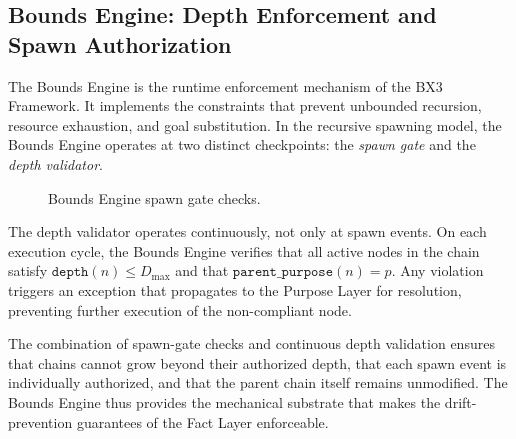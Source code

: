 \subsection{Bounds Engine: Depth Enforcement and Spawn Authorization}
\label{sec:bounds-engine}

The Bounds Engine is the runtime enforcement mechanism of the BX3 Framework. It implements the constraints that prevent unbounded recursion, resource exhaustion, and goal substitution. In the recursive spawning model, the Bounds Engine operates at two distinct checkpoints: the \emph{spawn gate} and the \emph{depth validator}.

\begin{figure}[htbp]
\centering
{}
\caption{Bounds Engine spawn gate checks.}
\label{fig:spawn-gate-checks}
\end{figure}

The depth validator operates continuously, not only at spawn events. On each execution cycle, the Bounds Engine verifies that all active nodes in the chain satisfy $\texttt{depth}(n) \leq D_{\max}$ and that $\texttt{parent\_purpose}(n) = p$. Any violation triggers an exception that propagates to the Purpose Layer for resolution, preventing further execution of the non-compliant node.

The combination of spawn-gate checks and continuous depth validation ensures that chains cannot grow beyond their authorized depth, that each spawn event is individually authorized, and that the parent chain itself remains unmodified. The Bounds Engine thus provides the mechanical substrate that makes the drift-prevention guarantees of the Fact Layer enforceable.

